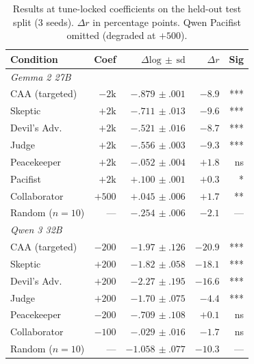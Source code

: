 \documentclass{article}
\theoremstyle{plain}
\theoremstyle{definition}
\theoremstyle{remark}
\begin{document}
\begin{table}[t]
\caption{Results at tune-locked coefficients on the held-out test split ($3$ seeds). $\Delta r$ in percentage points. Qwen Pacifist omitted (degraded at $+500$).}
\label{tab:main}
\vskip 0.1in
\begin{center}
\begin{small}
\begin{sc}
\begin{tabular}{lrrrr}
\toprule
Condition & Coef & $\Delta\mathrm{log}\,\pm\,\mathrm{sd}$ & $\Delta r$ & Sig \\
\midrule
\multicolumn{5}{l}{\emph{Gemma 2 27B}} \\
CAA (targeted)   & $-2\mathrm{k}$ & $-.879\,\pm.001$ & $-8.9$ & *** \\
Skeptic          & $+2\mathrm{k}$ & $-.711\,\pm.013$ & $-9.6$ & *** \\
Devil's Adv.     & $+2\mathrm{k}$ & $-.521\,\pm.016$ & $-8.7$ & *** \\
Judge            & $+2\mathrm{k}$ & $-.556\,\pm.003$ & $-9.3$ & *** \\
Peacekeeper      & $+2\mathrm{k}$ & $-.052\,\pm.004$ & $+1.8$ & ns  \\
Pacifist         & $+2\mathrm{k}$ & $+.100\,\pm.001$ & $+0.3$ & *   \\
Collaborator     & $+500$         & $+.045\,\pm.006$ & $+1.7$ & **  \\
Random ($n=10$)  & ---            & $-.254\,\pm.006$ & $-2.1$ & --- \\
\midrule
\multicolumn{5}{l}{\emph{Qwen 3 32B}} \\
CAA (targeted)   & $-200$         & $-1.97\,\pm.126$ & $-20.9$ & *** \\
Skeptic          & $+200$         & $-1.82\,\pm.058$ & $-18.1$ & *** \\
Devil's Adv.     & $+200$         & $-2.27\,\pm.195$ & $-16.6$ & *** \\
Judge            & $+200$         & $-1.70\,\pm.075$ & $-4.4$  & *** \\
Peacekeeper      & $-200$         & $-.709\,\pm.108$ & $+0.1$  & ns  \\
Collaborator     & $-100$         & $-.029\,\pm.016$ & $-1.7$  & ns  \\
Random ($n=10$)  & ---            & $-1.058\,\pm.077$& $-10.3$ & --- \\
\bottomrule
\end{tabular}
\end{sc}
\end{small}
\end{center}
\vskip -0.1in
\end{table}
\end{document}
